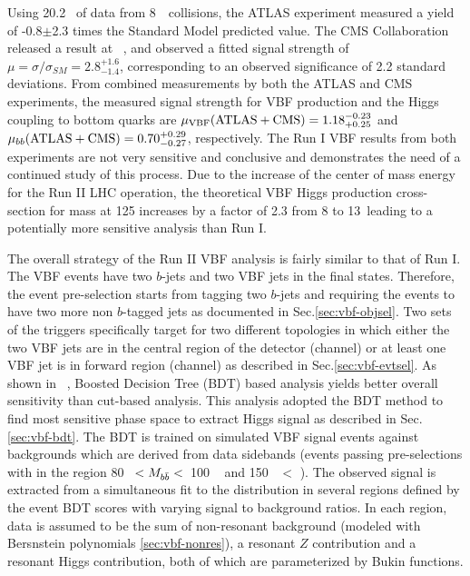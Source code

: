 Using 20.2 \ifb~of data from 8~\tev~collisions, the ATLAS experiment measured a yield of -0.8$\pm$2.3 times the Standard Model predicted value\cite{HIGG-2014-12}. The CMS Collaboration released a result\cite{CMS-HIG-14-004} at ~\tev, and observed a fitted signal strength of $\mu = \sigma/\sigma_{SM} = 2.8^{+1.6}_{-1.4}$, corresponding to an observed significance of 2.2 standard deviations.   From combined measurements by both the ATLAS and CMS experiments\cite{HIGG-2015-07}, the measured signal strength for VBF production and the Higgs coupling to bottom quarks are $\mu_{\rm VBF}({\rm ATLAS+CMS})  = 1.18_{+0.25}^{-0.23}$ and $\mu_{bb} ({\rm ATLAS+CMS}) = 0.70^{+0.29}_{-0.27}$, respectively. The Run I VBF \Hbb results from both experiments are not very sensitive and conclusive and demonstrates the need of a continued study of this process. Due to the increase of the center of mass energy for the Run II LHC operation, the theoretical VBF Higgs production cross-section for mass at 125 \GeV increases by a factor of 2.3 from 8 to 13~\tev leading to a potentially more sensitive analysis than Run I. 

The overall strategy of the Run II VBF \Hbb analysis is fairly similar to that of Run I. The VBF \Hbb events have two $b$-jets and two VBF jets in the final states. Therefore, the event pre-selection starts from tagging two $b$-jets and requiring the events to have two more non $b$-tagged jets as documented in Sec.\ref{sec:vbf-objsel}. Two sets of the triggers specifically target for two different topologies in which either the two VBF jets are in the central region of the detector (\fourcentral channel) or at least one VBF jet is in forward region (\twocentral channel) as described in Sec.\ref{sec:vbf-evtsel}. As shown in ~\cite{HIGG-2014-12}, Boosted Decision Tree (BDT) based analysis yields better overall sensitivity than cut-based analysis. This analysis adopted the BDT method to find most sensitive phase space to extract Higgs signal as described in Sec.\ref{sec:vbf-bdt}. The BDT is trained on simulated VBF signal events against backgrounds which are derived from data sidebands (events passing pre-selections with \Mbb in the region 80 \GeV~$< M_{b\bar{b}}<$~100 \GeV~ and  150 \GeV~$<$ \Mbb). The observed signal is extracted from a simultaneous fit to the \Mbb distribution in several regions defined by the event BDT scores with varying signal to background ratios. In each region, data is assumed to be the sum of non-resonant background (modeled with Bersnstein polynomials \ref{sec:vbf-nonres}), a resonant $Z$ contribution and a resonant Higgs contribution, both of which are parameterized by Bukin functions.

